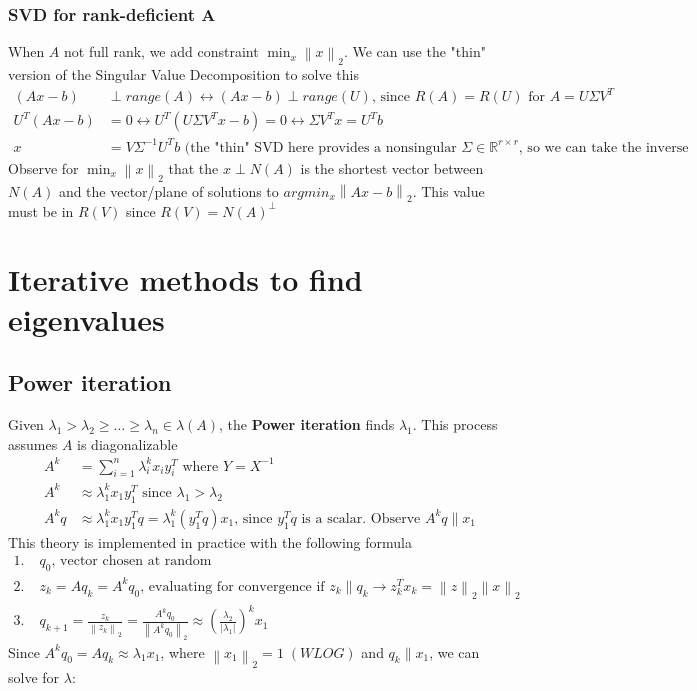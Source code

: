 \documentclass{article}
\newcommand{\norm}[2]{\left\lVert#1\right\rVert_#2}
\newcommand{\abs}[1]{\lvert#1\rvert}
\begin{document}
\subsubsection{SVD for rank-deficient A}
When $A$ not full rank, we add constraint $\min_x \norm{x}{2}$. We can use the "thin" version of the Singular Value Decomposition to solve this
\begin{align*}
    (Ax-b) &\perp range(A) \longleftrightarrow (Ax-b) \perp range(U) \textrm{, since $R(A) = R(U)$ for $A=U\Sigma V^T$}\\
    U^T(Ax-b) &= 0 \longleftrightarrow U^T(U\Sigma V^Tx - b) = 0 \longleftrightarrow \Sigma V^Tx = U^Tb\\ 
    x &= V\Sigma^{-1}U^Tb \textrm{ (the "thin" SVD here provides a nonsingular $\Sigma\in \mathbb{R}^{r \times r}$, so we can take the inverse}
\end{align*}
Observe for $\min_x \norm{x}{2}$ that the $x \perp N(A)$ is the shortest vector between $N(A)$ and the vector/plane of solutions to $argmin_x\norm{Ax - b}{2}$. This value must be in $R(V)$ since $R(V) = N(A)^\perp$


\section{Iterative methods to find eigenvalues}
\subsection{Power iteration}
Given $\lambda_1 > \lambda_2 \geq \dots \geq \lambda_n \in \lambda(A)$, the \textbf{Power iteration} finds $\lambda_1$. This process assumes $A$ is diagonalizable
\begin{align*}
    A^k &= \sum_{i = 1}^n \lambda_i^k x_i y_i^T \textrm{ where $Y = X^{-1}$}\\
    A^k &\approx \lambda_1^kx_1y_1^T \textrm{ since } \lambda_1 > \lambda_2\\
    A^kq &\approx \lambda_1^kx_1y_1^Tq = \lambda_1^k(y_1^Tq)x_1 \textrm{, since $y_1^Tq$ is a scalar. Observe } A^kq \parallel x_1
\end{align*}
This theory is implemented in practice with the following formula
\begin{align*}
    1. \;& q_0 \textrm{, vector chosen at random}\\
    2. \;& z_k = Aq_k = A^kq_0 \textrm{, evaluating for convergence if } z_k \parallel q_k \rightarrow z_k^Tx_k = \norm{z}{2}\norm{x}{2}\\
    3. \;& q_{k+1} = \frac{z_k}{\norm{z_k}{2}} = \frac{A^kq_0}{\norm{A^kq_0}{2}} \approx (\frac{\lambda_2}{\abs{\lambda_1}})^kx_1
\end{align*}
Since $A^{k}q_0 = Aq_{k} \approx \lambda_1 x_1$, where $\norm{x_1}{2} = 1 \; (WLOG)$ and $q_k \parallel x_1$, we can solve for $\lambda$:
\end{document}
